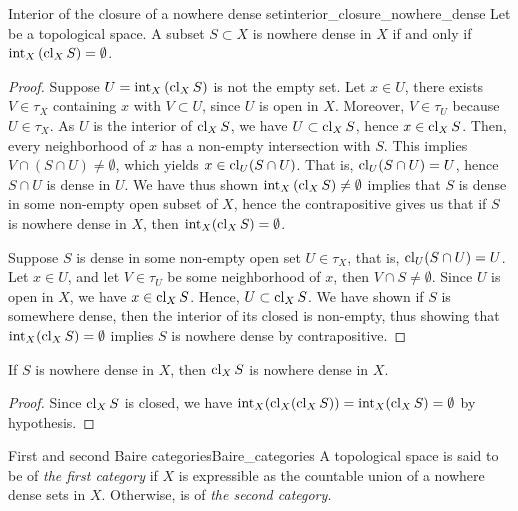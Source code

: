 \begin{theorem}{Interior of the closure of a nowhere dense set}{interior_closure_nowhere_dense}
    Let  be a topological space. A subset \(S \subset X\) is nowhere dense in \(X\) if and only if \(\operatorname{int}_X\left(\operatorname{cl}_X S\right) = \emptyset\).
\end{theorem}
\begin{proof}
    Suppose \(U = \operatorname{int}_X\left(\operatorname{cl}_X S\right)\) is not the empty set. Let \(x \in U\), there exists \(V \in \tau_X\) containing \(x\) with \(V \subset U\), since \(U\) is open in \(X\). Moreover, \(V \in \tau_U\) because \(U \in \tau_X\). As \(U\) is the interior of \(\operatorname{cl}_XS\), we have \(U \subset \operatorname{cl}_X S\), hence \(x \in \operatorname{cl}_X S\). Then, every neighborhood of \(x\) has a non-empty intersection with \(S\). This implies \(V \cap (S \cap U) \neq \emptyset\), which yields \(x \in \operatorname{cl}_U(S \cap U)\). That is, \(\operatorname{cl}_U(S\cap U) = U\), hence \(S \cap U\) is dense in \(U\). We have thus shown \(\operatorname{int}_X\left(\operatorname{cl}_X S\right) \neq \emptyset\) implies that \(S\) is dense in some non-empty open subset of \(X\), hence the contrapositive gives us that if \(S\) is nowhere dense in \(X\), then \(\operatorname{int}_X(\operatorname{cl}_XS) = \emptyset\).

    Suppose \(S\) is dense in some non-empty open set \(U \in \tau_X\), that is, \(\operatorname{cl}_U(S \cap U) = U\). Let \(x \in U\), and let \(V \in \tau_U\) be some neighborhood of \(x\), then \(V \cap S \neq \emptyset\). Since \(U\) is open in \(X\), we have \(x \in \operatorname{cl}_X S\). Hence, \(U \subset \operatorname{cl}_X S\). We have shown if \(S\) is somewhere dense, then the interior of its closed is non-empty, thus showing that \(\operatorname{int}_X (\operatorname{cl}_X S) = \emptyset\) implies \(S\) is nowhere dense by contrapositive.
\end{proof}
\begin{corollary}
    If \(S\) is nowhere dense in \(X\), then \(\operatorname{cl}_X{S}\) is nowhere dense in \(X\).
\end{corollary}
\begin{proof}
    Since \(\operatorname{cl}_XS\) is closed, we have \(\operatorname{int}_X(\operatorname{cl}_X(\operatorname{cl}_X S)) = \operatorname{int}_X(\operatorname{cl}_X S) = \emptyset\) by hypothesis.
\end{proof}

\begin{definition}{First and second Baire categories}{Baire_categories}
    A topological space  is said to be of \emph{the first category} if \(X\) is expressible as the countable union of a nowhere dense sets in \(X\). Otherwise,  is of \emph{the second category.}
\end{definition}
